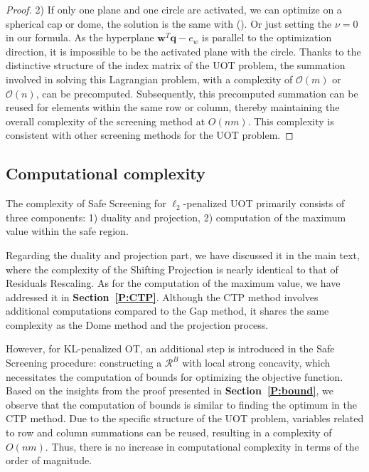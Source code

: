 \documentclass[11pt]{article}
\renewcommand{\vec}[1]{\bm{#1}}
\begin{document}
\begin{proof}
2) If only one plane and one circle are activated, we can optimize on a spherical cap or dome, the solution is the same with (\cite{Yamada_NIPS_2021}). Or just setting the $\nu = 0$ in our formula. As the hyperplane $\vec{w}^T\vec{q} - e_w $ is parallel to the optimization direction, it is impossible to be the activated plane with the circle.
Thanks to the distinctive structure of the index matrix of the UOT problem, the summation involved in solving this Lagrangian problem, with a complexity of $\mathcal{O}(m)$ or $\mathcal{O}(n)$, can be precomputed. Subsequently, this precomputed summation can be reused for elements within the same row or column, thereby maintaining the overall complexity of the screening method at $O(nm)$. This complexity is consistent with other screening methods for the UOT problem.
\end{proof}


\subsection{Computational complexity}
The complexity of Safe Screening for $\ell_2$-penalized UOT primarily consists of three components: 1) duality and projection, 2) computation of the maximum value within the safe region. 

Regarding the duality and projection part, we have discussed it in the main text, where the complexity of the Shifting Projection is nearly identical to that of Residuals Rescaling. As for the computation of the maximum value, we have addressed it in \textbf{Section~\ref{P:CTP}}. Although the CTP method involves additional computations compared to the Gap method, it shares the same complexity as the Dome method and the projection process.

However, for KL-penalized OT, an additional step is introduced in the Safe Screening procedure: constructing a $\mathcal{R}^{B}$ with local strong concavity, which necessitates the computation of bounds for optimizing the objective function. Based on the insights from the proof presented in \textbf{Section~\ref{P:bound}}, we observe that the computation of bounds is similar to finding the optimum in the CTP method. Due to the specific structure of the UOT problem, variables related to row and column summations can be reused, resulting in a complexity of $O(nm)$. Thus, there is no increase in computational complexity in terms of the order of magnitude.
\end{document}
